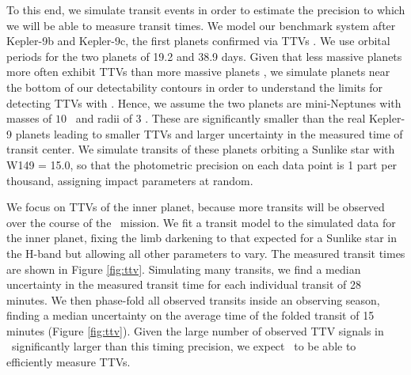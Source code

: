 To this end, we simulate transit events in order to estimate the precision to which we will
be able to measure transit times. We model our benchmark system after Kepler-9b and Kepler-9c, the first planets confirmed via TTVs \citep{Holman10}.
We use orbital periods for the two planets of 19.2 and 38.9 days. 
Given that less massive planets more often exhibit TTVs than more massive planets 
\citep{Mazeh13}, we simulate planets near the bottom of our detectability
contours in order to understand the limits for detecting TTVs with \WF. Hence, we assume the two planets are mini-Neptunes with masses of $10$ \mearth\ and radii of $3$ \rearth. These are significantly smaller than the real Kepler-9 planets leading to smaller TTVs and larger uncertainty in the measured time of transit center.
We simulate transits of these planets orbiting a Sunlike star with W149 = 15.0, so that
the photometric precision on each data point is 1 part per thousand, assigning 
impact parameters at random. 

We focus on TTVs of the inner planet, because more transits will be observed over the course of the \WF\ mission.
We fit a transit model to the simulated data for the inner planet, fixing the limb darkening to that
expected for a Sunlike star in the H-band but allowing all other parameters to vary. The measured transit times are shown in Figure \ref{fig:ttv}.
Simulating many transits, we find a median uncertainty in the measured transit time
for each individual transit
of 28 minutes. 
We then phase-fold all observed transits inside an observing season, finding a median
uncertainty on the average time of the folded transit of 15 minutes (Figure \ref{fig:ttv}). 
Given the large number of observed TTV signals in \kep\ significantly larger than this
timing precision, we expect \WF\ to be able to efficiently measure TTVs.




